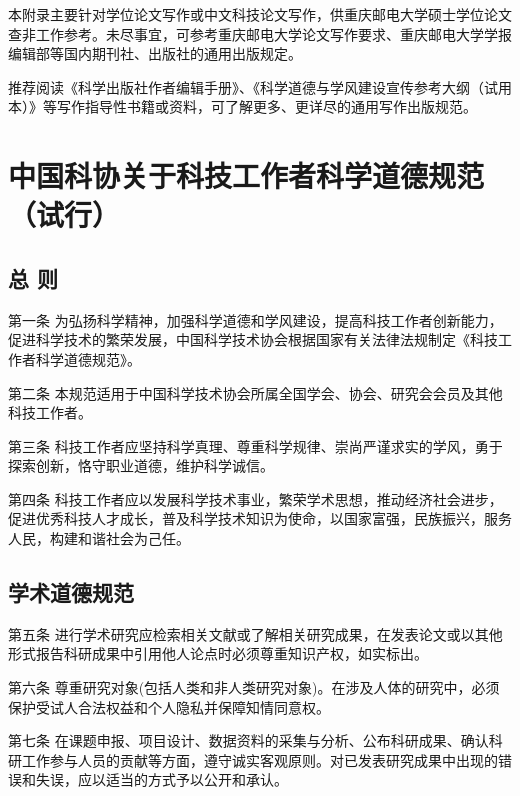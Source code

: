 \documentclass{cqupt_thesis}
\begin{document}
    本附录主要针对学位论文写作或中文科技论文写作，供重庆邮电大学硕士学位论文查非工作参考。未尽事宜，可参考重庆邮电大学论文写作要求、重庆邮电大学学报编辑部等国内期刊社、出版社的通用出版规定。

    推荐阅读《科学出版社作者编辑手册》、《科学道德与学风建设宣传参考大纲（试用本）》等写作指导性书籍或资料，可了解更多、更详尽的通用写作出版规范。


    \chapter{中国科协关于科技工作者科学道德规范（试行）}


    \section{总 则}
    第一条 为弘扬科学精神，加强科学道德和学风建设，提高科技工作者创新能力，促进科学技术的繁荣发展，中国科学技术协会根据国家有关法律法规制定《科技工作者科学道德规范》。

    第二条 本规范适用于中国科学技术协会所属全国学会、协会、研究会会员及其他科技工作者。

    第三条 科技工作者应坚持科学真理、尊重科学规律、崇尚严谨求实的学风，勇于探索创新，恪守职业道德，维护科学诚信。

    第四条 科技工作者应以发展科学技术事业，繁荣学术思想，推动经济社会进步，促进优秀科技人才成长，普及科学技术知识为使命，以国家富强，民族振兴，服务人民，构建和谐社会为己任。


    \section{学术道德规范}

    第五条 进行学术研究应检索相关文献或了解相关研究成果，在发表论文或以其他形式报告科研成果中引用他人论点时必须尊重知识产权，如实标出。

    第六条 尊重研究对象(包括人类和非人类研究对象)。在涉及人体的研究中，必须保护受试人合法权益和个人隐私并保障知情同意权。

    第七条 在课题申报、项目设计、数据资料的采集与分析、公布科研成果、确认科研工作参与人员的贡献等方面，遵守诚实客观原则。对已发表研究成果中出现的错误和失误，应以适当的方式予以公开和承认。
\end{document}
